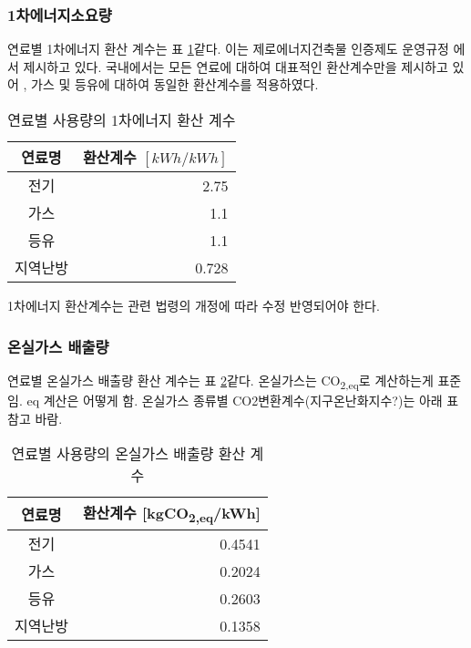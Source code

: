 \subsubsection{1차에너지소요량}
연료별 1차에너지 환산 계수는 표 \ref{tbl:coeff_kWh_to_1stkWh}\와 같다. 이는 제로에너지건축물 인증제도 운영규정 \cite{law:energy_to_1stenergy} 에서 제시하고 있다. 국내에서는 모든 연료에 대하여 대표적인 환산계수만을 제시하고 있어 \cite{Jeong2021energydeungkeup}, 가스 및 등유에 대하여 동일한 환산계수를 적용하였다.

\begin{table}[ht]
  \caption{연료별 사용량의 1차에너지 환산 계수}
  \label{tbl:coeff_kWh_to_1stkWh}  
  \centering
  \begin{tabular}{cr}
    \toprule
    연료명 & \makecell{환산계수 \\ $[kWh/kWh]$} \\ \midrule
    전기 & 2.75 \\
    가스 & 1.1 \\
    등유 & 1.1 \\
    지역난방 & 0.728 \\ \bottomrule
  \end{tabular}
\end{table}

1차에너지 환산계수는 관련 법령의 개정에 따라 수정 반영되어야 한다.

\subsubsection{온실가스 배출량}
연료별 온실가스 배출량 환산 계수는 표 \ref{tbl:coeff_kWh_to_CO2}\와 같다. 온실가스는 CO\textsubscript{2,eq}로 계산하는게 표준임. eq 계산은 어떻게 함. 온실가스 종류별 CO2변환계수(지구온난화지수?)는 아래 표 참고 바람.

\begin{table}[ht]
  \caption{연료별 사용량의 온실가스 배출량 환산 계수}
  \label{tbl:coeff_kWh_to_CO2}  
  \centering
  \begin{tabular}{cr}
    \toprule
    연료명 & 환산계수 [kgCO\textsubscript{2,eq}/kWh] \\ \midrule
    전기 & 0.4541 \\
    가스 & 0.2024 \\
    등유 & 0.2603 \\
    지역난방 & 0.1358 \\ \bottomrule
  \end{tabular}
\end{table}


